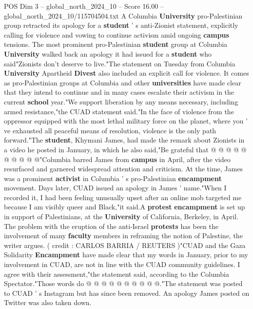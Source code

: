 \begin{textsample}{POS Dim 3 – global\_north\_2024\_10 – Score 16.00 – global\_north\_2024\_10/115704504.txt}  \label{ex:f3_pos_157}
A Columbia \textbf{University} pro-Palestinian group retracted its apology for a \textbf{student} ' s anti-Zionist statement, explicitly calling for violence and vowing to continue activism amid ongoing \textbf{campus} tensions.
The most prominent pro-Palestinian \textbf{student} group at Columbia \textbf{University} walked back an apology it had issued for a \textbf{student} who said"Zionists don't deserve to live."The statement on Tuesday from Columbia \textbf{University} Apartheid \textbf{Divest} also included an explicit call for violence.
It comes as pro-Palestinian groups at Columbia and other \textbf{universities} have made clear that they intend to continue and in many cases escalate their activism in the current \textbf{school} year."We support liberation by any means necessary, including armed resistance,"the CUAD statement said."In the face of violence from the oppressor equipped with the most lethal military force on the planet, where you ' ve exhausted all peaceful means of resolution, violence is the only path forward."The \textbf{student}, Khymani James, had made the remark about Zionists in a video he posted in January, in which he also said,"Be grateful that @ @ @ @ @ @ @ @ @ @"Columbia barred James from \textbf{campus} in April, after the video resurfaced and garnered widespread attention and criticism.
At the time, James was a prominent \textbf{activist} in Columbia ' s pro-Palestinian \textbf{encampment} movement.
Days later, CUAD issued an apology in James ' name."When I recorded it, I had been feeling unusually upset after an online mob targeted me because I am visibly queer and Black,"it said.A \textbf{protest} \textbf{encampment} is set up in support of Palestinians, at the \textbf{University} of California, Berkeley, in April.
The problem with the eruption of the anti-Israel \textbf{protests} has been the involvement of many \textbf{faculty} members in reframing the notion of Palestine, the writer argues. ( credit : CARLOS BARRIA / REUTERS )"CUAD and the Gaza Solidarity \textbf{Encampment} have made clear that my words in January, prior to my involvement in CUAD, are not in line with the CUAD community guidelines.
I agree with their assessment,"the statement said, according to the Columbia Spectator."Those words do @ @ @ @ @ @ @ @ @ @."The statement was posted to CUAD ' s Instagram but has since been removed.
An apology James posted on Twitter was also taken down.

\end{textsample}

